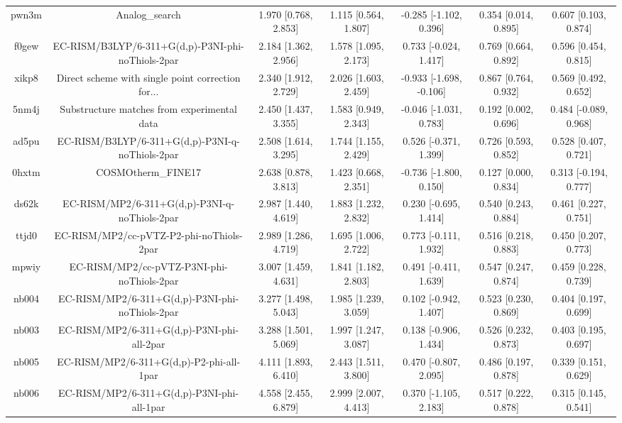 \documentclass{article}
\begin{document}
\begin{center}
\begin{longtable}{|ccccccc|}
 pwn3m &                                     Analog\_search &  1.970 [0.768, 2.853] &  1.115 [0.564, 1.807] &   -0.285 [-1.102, 0.396] &  0.354 [0.014, 0.895] &   0.607 [0.103, 0.874] \\
 f0gew &  EC-RISM/B3LYP/6-311+G(d,p)-P3NI-phi-noThiols-2par &  2.184 [1.362, 2.956] &  1.578 [1.095, 2.173] &    0.733 [-0.024, 1.417] &  0.769 [0.664, 0.892] &   0.596 [0.454, 0.815] \\
 xikp8 &  Direct scheme with single point correction for... &  2.340 [1.912, 2.729] &  2.026 [1.603, 2.459] &  -0.933 [-1.698, -0.106] &  0.867 [0.764, 0.932] &   0.569 [0.492, 0.652] \\
 5nm4j &        Substructure matches from experimental data &  2.450 [1.437, 3.355] &  1.583 [0.949, 2.343] &   -0.046 [-1.031, 0.783] &  0.192 [0.002, 0.696] &  0.484 [-0.089, 0.968] \\
 ad5pu &    EC-RISM/B3LYP/6-311+G(d,p)-P3NI-q-noThiols-2par &  2.508 [1.614, 3.295] &  1.744 [1.155, 2.429] &    0.526 [-0.371, 1.399] &  0.726 [0.593, 0.852] &   0.528 [0.407, 0.721] \\
 0hxtm &                                 COSMOtherm\_FINE17 &  2.638 [0.878, 3.813] &  1.423 [0.668, 2.351] &   -0.736 [-1.800, 0.150] &  0.127 [0.000, 0.834] &  0.313 [-0.194, 0.777] \\
 ds62k &      EC-RISM/MP2/6-311+G(d,p)-P3NI-q-noThiols-2par &  2.987 [1.440, 4.619] &  1.883 [1.232, 2.832] &    0.230 [-0.695, 1.414] &  0.540 [0.243, 0.884] &   0.461 [0.227, 0.751] \\
 ttjd0 &           EC-RISM/MP2/cc-pVTZ-P2-phi-noThiols-2par &  2.989 [1.286, 4.719] &  1.695 [1.006, 2.722] &    0.773 [-0.111, 1.932] &  0.516 [0.218, 0.883] &   0.450 [0.207, 0.773] \\
 mpwiy &         EC-RISM/MP2/cc-pVTZ-P3NI-phi-noThiols-2par &  3.007 [1.459, 4.631] &  1.841 [1.182, 2.803] &    0.491 [-0.411, 1.639] &  0.547 [0.247, 0.874] &   0.459 [0.228, 0.739] \\
 nb004 &    EC-RISM/MP2/6-311+G(d,p)-P3NI-phi-noThiols-2par &  3.277 [1.498, 5.043] &  1.985 [1.239, 3.059] &    0.102 [-0.942, 1.407] &  0.523 [0.230, 0.869] &   0.404 [0.197, 0.699] \\
 nb003 &         EC-RISM/MP2/6-311+G(d,p)-P3NI-phi-all-2par &  3.288 [1.501, 5.069] &  1.997 [1.247, 3.087] &    0.138 [-0.906, 1.434] &  0.526 [0.232, 0.873] &   0.403 [0.195, 0.697] \\
 nb005 &           EC-RISM/MP2/6-311+G(d,p)-P2-phi-all-1par &  4.111 [1.893, 6.410] &  2.443 [1.511, 3.800] &    0.470 [-0.807, 2.095] &  0.486 [0.197, 0.878] &   0.339 [0.151, 0.629] \\
 nb006 &         EC-RISM/MP2/6-311+G(d,p)-P3NI-phi-all-1par &  4.558 [2.455, 6.879] &  2.999 [2.007, 4.413] &    0.370 [-1.105, 2.183] &  0.517 [0.222, 0.878] &   0.315 [0.145, 0.541] \\
\end{longtable}
\end{center}
\end{document}
